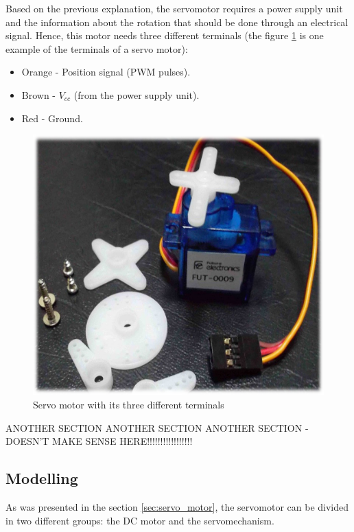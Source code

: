 Based on the previous explanation, the servomotor requires a power supply unit and the information about the rotation that should be done through an electrical signal. Hence, this motor needs three different terminals (the figure \ref{cable_servo} is one example of the terminals of a servo motor):
\begin{itemize}  
        \item Orange - Position signal (PWM pulses).
        \item Brown - $V_{cc}$ (from the power supply unit). 
        \item Red - Ground.
\end{itemize}

\begin{figure}[H]
\centering
\includegraphics[scale=0.5]{figures/cable_servo.png}
\caption{Servo motor with its three different terminals}
\label{cable_servo}
\end{figure}

ANOTHER SECTION ANOTHER SECTION ANOTHER SECTION - DOESN’T MAKE SENSE HERE!!!!!!!!!!!!!!!!!

\subsection{Modelling}

As was presented in the section \ref{sec:servo_motor}, the servomotor can be divided in two different groups: the DC motor and the servomechanism.

